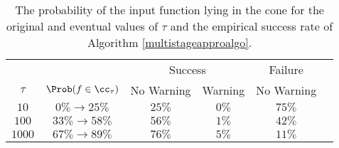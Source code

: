 \begin{table}[h]
\centering
\begin{tabular}{cccccc}
&&\multicolumn{2}{c}{Success} & Failure \\
$\tau$ &  $\Prob(f \in \cc_{\tau}) $ & No Warning & Warning & No Warning \\
\toprule
$10$ & $0\% \rightarrow  25\% $ & $25\%$  & $0\%$  &$75\%$ \\
$100$ & $33 \% \rightarrow 58\% $ & $56\%$ & $1\%$ & $42\%$ \\
$1000$ & $67\% \rightarrow 89\% $& $76\%$ & $5\%$ & $11\%$\\
\end{tabular}
\caption{The probability of the input function lying in the cone for the original and eventual values of $\tau$ and the empirical success rate of Algorithm \ref{multistageapproalgo}.  \label{approxnumerical}}
\end{table}





